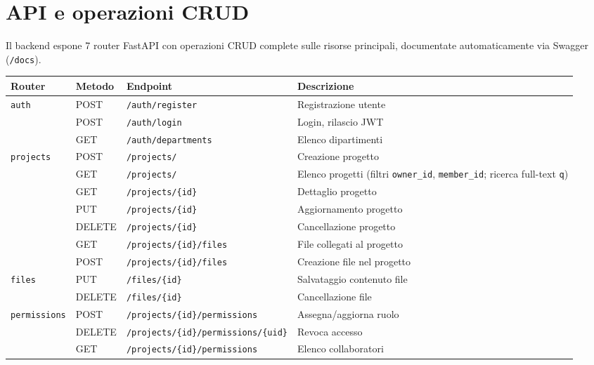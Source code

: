 \documentclass[11pt,a4paper]{article}
\begin{document}
\pagebreak

\section{API e operazioni CRUD}

Il backend espone 7 router FastAPI con operazioni CRUD complete sulle risorse principali, documentate automaticamente via Swagger (\texttt{/docs}).

\begin{table}[h!]
\centering
\scriptsize
\begin{tabular}{@{}p{1.9cm}p{1.1cm}p{5.4cm}p{4.4cm}@{}}
\toprule
\textbf{Router} & \textbf{Metodo} & \textbf{Endpoint} & \textbf{Descrizione} \\
\midrule
\texttt{auth} & POST & \texttt{/auth/register} & Registrazione utente \\
 & POST & \texttt{/auth/login} & Login, rilascio JWT \\
 & GET & \texttt{/auth/departments} & Elenco dipartimenti \\
\texttt{projects} & POST & \texttt{/projects/} & Creazione progetto \\
 & GET & \texttt{/projects/} & Elenco progetti (filtri \texttt{owner\_id}, \texttt{member\_id}; ricerca full-text \texttt{q}) \\
 & GET & \texttt{/projects/\{id\}} & Dettaglio progetto \\
 & PUT & \texttt{/projects/\{id\}} & Aggiornamento progetto \\
 & DELETE & \texttt{/projects/\{id\}} & Cancellazione progetto \\
 & GET & \texttt{/projects/\{id\}/files} & File collegati al progetto \\
 & POST & \texttt{/projects/\{id\}/files} & Creazione file nel progetto \\
\texttt{files} & PUT & \texttt{/files/\{id\}} & Salvataggio contenuto file \\
 & DELETE & \texttt{/files/\{id\}} & Cancellazione file \\
\texttt{permissions} & POST & \texttt{/projects/\{id\}/permissions} & Assegna/aggiorna ruolo \\
 & DELETE & \texttt{/projects/\{id\}/permissions/\{uid\}} & Revoca accesso \\
 & GET & \texttt{/projects/\{id\}/permissions} & Elenco collaboratori \\

\end{tabular}
\end{table}
\end{document}
